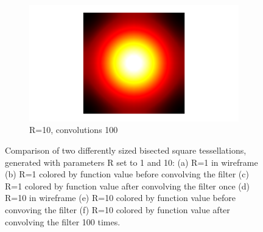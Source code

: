 \begin{figure}[ht]
\begin{subfigure}[b]{0.32\linewidth}
		\includegraphics[width=\linewidth]
		{data/synthetic_meshes/square_tesselation_4tri_Dirac_delta_10_v841_f1600_funcvals_100iter.png}
		\caption{R=10, convolutions 100}\label{fig:sq2.f}
	\end{subfigure}
	\caption[Six views, comparing two differently sized of bisected square tessellations]{Comparison of two differently sized bisected square tessellations, generated with parameters R set to 1 and 10: (a) R=1 in wireframe (b) R=1 colored by function value before convolving the filter (c) R=1 colored by function value after convolving the filter once (d) R=10 in wireframe (e) R=10 colored by function value before convoving the filter (f) R=10 colored by function value after convolving the filter 100 times.}
	\label{fig:sq2}
\end{figure}
